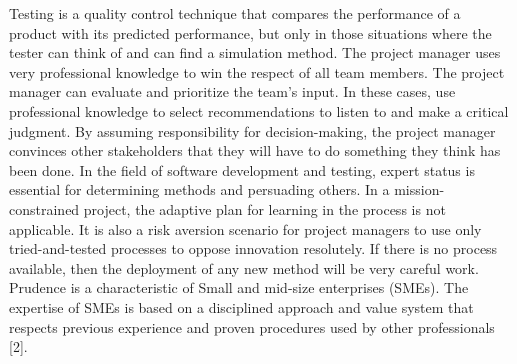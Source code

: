 \documentclass{sigchi}
\begin{document}
Testing is a quality control technique that compares the performance of a product with its predicted performance, but only in those situations where the tester can think of and can find a simulation method. The project manager uses very professional knowledge to win the respect of all team members. The project manager can evaluate and prioritize the team's input. In these cases, use professional knowledge to select recommendations to listen to and make a critical judgment. By assuming responsibility for decision-making, the project manager convinces other stakeholders that they will have to do something they think has been done. In the field of software development and testing, expert status is essential for determining methods and persuading others. In a mission-constrained project, the adaptive plan for learning in the process is not applicable. It is also a risk aversion scenario for project managers to use only tried-and-tested processes to oppose innovation resolutely. If there is no process available, then the deployment of any new method will be very careful work. Prudence is a characteristic of Small and mid-size enterprises (SMEs). The expertise of SMEs is based on a disciplined approach and value system that respects previous experience and proven procedures used by other professionals [2].
\end{document}
